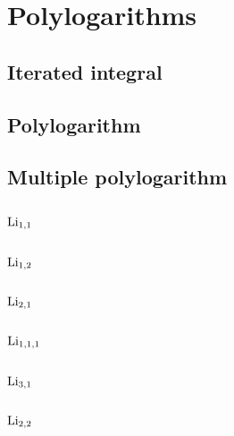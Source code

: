 \documentclass[main]{subfiles}
\begin{document}
\chapter{Polylogarithms}

\tableofcontents
\newpage

\section{Iterated integral}

\newpage

\section{Polylogarithm}

\newpage

\section{Multiple polylogarithm}

\newpage

\section{$\operatorname{Li}_{1,1}$}

\newpage

\section{$\operatorname{Li}_{1,2}$}

\newpage

\section{$\operatorname{Li}_{2,1}$}

\newpage

\section{$\operatorname{Li}_{1,1,1}$}

\newpage

\section{$\operatorname{Li}_{3,1}$}

\newpage

\section{$\operatorname{Li}_{2,2}$}

\newpage
\end{document}
